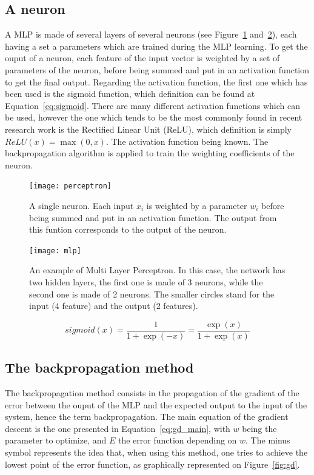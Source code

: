 \subsection{A neuron}

A MLP is made of several layers of several neurons (see Figure~\ref{fig:neuron} 
and~\ref{fig:mlp}), each having a set a parameters which are trained during the 
MLP learning. To get the ouput of a neuron, each feature of the input vector is 
weighted by a set of parameters of the neuron, before being summed and put in an 
activation function to get the final output. Regarding the activation function, 
the first one which has been used is the sigmoid function, which definition can 
be found at Equation~\ref{eq:sigmoid}. There are many different activation 
functions which can be used, however the one which tends to be the most commonly 
found in recent research work is the Rectified Linear Unit (ReLU), which 
definition is simply $ReLU(x) = \max(0, x)$. The activation function being 
known. The backpropagation algorithm is applied to train the weighting 
coefficients of the neuron.


    \begin{figure}[h]
        \centering
        \texttt{[image: perceptron]}
        \caption{A single neuron. Each input $x_i$ is weighted by a parameter $w_i$ before being summed and put in an activation function. The output from this funtion corresponds to the output of the neuron.}
\label{fig:neuron}
    \end{figure}

    \begin{figure}[h]
        \centering
        \texttt{[image: mlp]}
        \caption{An example of Multi Layer Perceptron. In this case, the network has two hidden layers, the first one is made of 3 neurons, while the second one is made of 2 neurons. The smaller circles stand for the input (4 feature) and the output (2 features).}
\label{fig:mlp}
    \end{figure}

    \begin{equation}
        sigmoid(x) = \frac{1}{1 + \exp(-x)} = \frac{\exp(x)}{1 + \exp(x)}
        \label{eq:sigmoid}
    \end{equation}

    \subsection{The backpropagation method}
    The backpropagation method consists in the propagation of the gradient of the error between the ouput of the MLP and the expected output to the input of the system, hence the term backpropagation. The main equation of the gradient descent is the one presented in Equation~\ref{eq:gd_main}, with $w$ being the parameter to optimize, and $E$ the error function depending on $w$. The minus symbol represents the idea that, when using this method, one tries to achieve the lowest point of the error function, as graphically represented on Figure~\ref{fig:gd}. 

